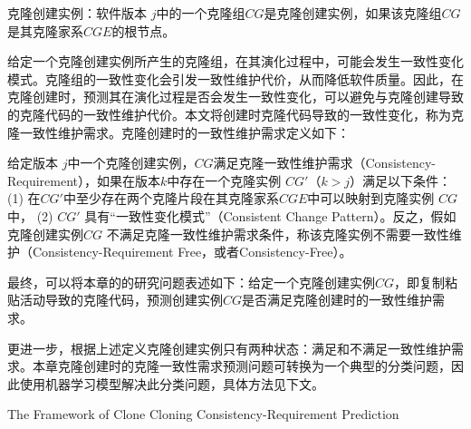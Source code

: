 \begin{definition}
\label{def-cloninginstance}
克隆创建实例：软件版本 $j$中的一个克隆组$CG$是克隆创建实例，如果该克隆组$CG$是其克隆家系$CGE$的根节点。
\end{definition}



给定一个克隆创建实例所产生的克隆组，在其演化过程中，可能会发生一致性变化模式。克隆组的一致性变化会引发一致性维护代价，从而降低软件质量。因此，在克隆创建时，预测其在演化过程是否会发生一致性变化，可以避免与克隆创建导致的克隆代码的一致性维护代价。本文将创建时克隆代码导致的一致性变化，称为克隆一致性维护需求。克隆创建时的一致性维护需求定义如下：\\

\begin{definition}
 \label{def-cloningconsistency}
给定版本 $j$中一个克隆创建实例，$CG$满足克隆一致性维护需求（Consistency-Requirement），如果在版本$k$中存在一个克隆实例 $CG'$（$k>j$）满足以下条件： (1) 在$CG'$中至少存在两个克隆片段在其克隆家系$CGE$中可以映射到克隆实例 $CG$中， (2) $CG'$ 具有“一致性变化模式”（Consistent Change Pattern）。反之，假如克隆创建实例$CG$ 不满足克隆一致性维护需求条件，称该克隆实例不需要一致性维护（Consistency-Requirement Free，或者Consistency-Free）。
\end{definition}


最终，可以将本章的的研究问题表述如下：给定一个克隆创建实例$CG$，即复制粘贴活动导致的克隆代码，预测创建实例$CG$是否满足克隆创建时的一致性维护需求。

更进一步，根据上述定义克隆创建实例只有两种状态：满足和不满足一致性维护需求。本章克隆创建时的克隆一致性需求预测问题可转换为一个典型的分类问题，因此使用机器学习模型解决此分类问题，具体方法见下文。

{The Framework of Clone Cloning Consistency-Requirement Prediction }


